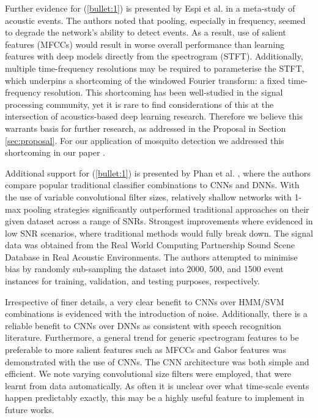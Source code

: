 \documentclass[12pt]{llncs}
\begin{document}
Further evidence for (\ref{bullet:1}) is presented by Espi et al. \cite{espi2015exploiting} in a meta-study of acoustic events. The authors noted that pooling, especially in frequency, seemed to degrade the network's ability to detect events. As a result, use of salient features (MFCCs) would result in worse overall performance than learning features with deep models directly from the spectrogram (STFT). Additionally, multiple time-frequency resolutions may be required to parameterise the STFT, which underpins a shortcoming of the windowed Fourier transform: a fixed time-frequency resolution. This shortcoming has been well-studied in the signal processing community, yet it is rare to find considerations of this at the intersection of acoustics-based deep learning research. Therefore we believe this warrants basis for further research, as addressed in the Proposal in Section \ref{sec:proposal}. For our application of mosquito detection we addressed this shortcoming in our paper \cite[Section 2.2]{kiskin2017mosquito}.


Additional support for (\ref{bullet:1}) is presented by Phan et al. \cite{phan2016robust}, where the authors compare popular traditional classifier combinations to CNNs and DNNs. 
With the use of variable convolutional filter sizes, relatively shallow networks with  1-max pooling strategies significantly outperformed traditional approaches on their given dataset across a range of SNRs. Strongest improvements where evidenced in low SNR scenarios, where traditional methods would fully break down. The signal data was obtained from the Real World Computing Partnership Sound Scene Database in Real Acoustic Environments. The authors attempted to minimise bias by randomly sub-sampling the dataset into  2000, 500, and 1500 event instances for training, validation, and testing purposes, respectively. 

Irrespective of finer details, a very clear benefit to CNNs over HMM/SVM combinations is evidenced with the introduction of noise. Additionally, there is a reliable benefit to CNNs over DNNs as consistent with speech recognition literature. Furthermore, a general trend for generic spectrogram features to be preferable to more salient features such as MFCCs and Gabor features was demonstrated with the use of CNNs. The CNN architecture was both simple and efficient. We note varying convolutional size filters were employed, that were learnt from data automatically. As often it is unclear over what time-scale events happen predictably exactly, this may be a highly useful feature to implement in future works.
\end{document}
